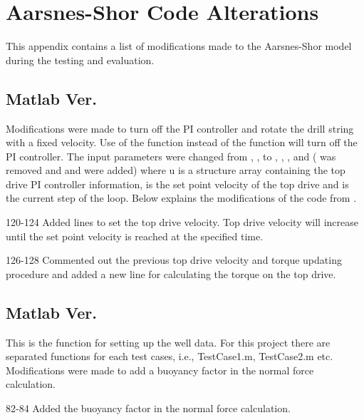 \chapter{Aarsnes-Shor Code Alterations}
This appendix contains a list of modifications made to the Aarsnes-Shor model during the testing and evaluation.

\section{Matlab Ver.\ }
Modifications were made to turn off the PI controller and rotate the drill string with a fixed velocity. Use of the function  instead of the function  will turn off the PI controller. The input parameters were changed from , ,  to , , , and  ( was removed and  and  were added) where u is a structure array containing the top drive PI controller information,  is the set point velocity of the top drive and  is the current step of the loop. Below explains the modifications of the code from .

\begin{codemodifications}
\begin{codemodification}{120-124}
Added lines to set the top drive velocity. Top drive velocity will increase until the set point velocity is reached at the specified time.
\end{codemodification}

\begin{codemodification}{126-128}
Commented out the previous top drive velocity and torque updating procedure and added a new line for calculating the torque on the top drive.
\end{codemodification}
\end{codemodifications}

\section{Matlab Ver.\ }
This is the function for setting up the well data. For this project there are separated functions for each test cases, i.e., TestCase1.m, TestCase2.m etc. Modifications were made to add a buoyancy factor in the normal force calculation.
\begin{codemodifications}
\begin{codemodification}{82-84}
Added the buoyancy factor in the normal force calculation.
\end{codemodification}
\end{codemodifications}

